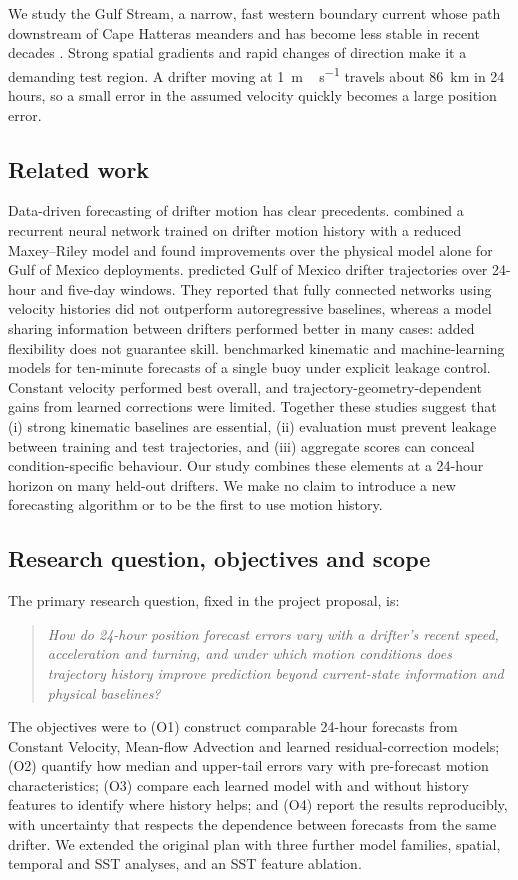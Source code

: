 We study the Gulf Stream, a narrow, fast western boundary current whose path downstream of Cape Hatteras meanders and has become less stable in recent decades \citep{andres2016}. Strong spatial gradients and rapid changes of direction make it a demanding test region. A drifter moving at \SI{1}{m\,s^{-1}} travels about \SI{86}{km} in 24 hours, so a small error in the assumed velocity quickly becomes a large position error.

\subsection{Related work}
Data-driven forecasting of drifter motion has clear precedents. \citet{aksamit2020} combined a recurrent neural network trained on drifter motion history with a reduced Maxey--Riley model and found improvements over the physical model alone for Gulf of Mexico deployments. \citet{grossi2025} predicted Gulf of Mexico drifter trajectories over 24-hour and five-day windows. They reported that fully connected networks using velocity histories did not outperform autoregressive baselines, whereas a model sharing information between drifters performed better in many cases: added flexibility does not guarantee skill. \citet{lin2026} benchmarked kinematic and machine-learning models for ten-minute forecasts of a single buoy under explicit leakage control. Constant velocity performed best overall, and trajectory-geometry-dependent gains from learned corrections were limited. Together these studies suggest that (i) strong kinematic baselines are essential, (ii) evaluation must prevent leakage between training and test trajectories, and (iii) aggregate scores can conceal condition-specific behaviour. Our study combines these elements at a 24-hour horizon on many held-out drifters. We make no claim to introduce a new forecasting algorithm or to be the first to use motion history.

\subsection{Research question, objectives and scope}
The primary research question, fixed in the project proposal, is:
\begin{quote}\itshape
How do 24-hour position forecast errors vary with a drifter's recent speed, acceleration and turning, and under which motion conditions does trajectory history improve prediction beyond current-state information and physical baselines?
\end{quote}
The objectives were to (O1) construct comparable 24-hour forecasts from Constant Velocity, Mean-flow Advection and learned residual-correction models; (O2) quantify how median and upper-tail errors vary with pre-forecast motion characteristics; (O3) compare each learned model with and without history features to identify where history helps; and (O4) report the results reproducibly, with uncertainty that respects the dependence between forecasts from the same drifter. We extended the original plan with three further model families, spatial, temporal and SST analyses, and an SST feature ablation.

